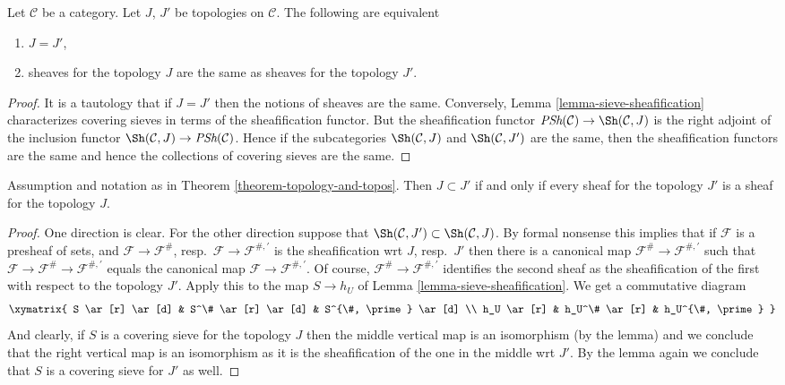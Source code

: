\begin{theorem}
\label{theorem-topology-and-topos}
Let $\mathcal{C}$ be a category.
Let $J$, $J'$ be topologies on $\mathcal{C}$.
The following are equivalent
\begin{enumerate}
\item $J = J'$,
\item sheaves for the topology $J$ are the same as
sheaves for the topology $J'$.
\end{enumerate}
\end{theorem}

\begin{proof}
It is a tautology that if $J = J'$ then the notions of sheaves
are the same. Conversely, Lemma \ref{lemma-sieve-sheafification}
characterizes covering sieves in terms of the sheafification
functor. But the sheafification functor
$\textit{PSh}(\mathcal{C}) \to \Sh(\mathcal{C}, J)$
is the right adjoint of the inclusion functor
$\Sh(\mathcal{C}, J) \to \textit{PSh}(\mathcal{C})$.
Hence if the subcategories
$\Sh(\mathcal{C}, J)$ and
$\Sh(\mathcal{C}, J')$ are the same, then the sheafification
functors are the same and hence the collections of covering
sieves are the same.
\end{proof}

\begin{lemma}
\label{lemma-finer-topology}
Assumption and notation as in Theorem \ref{theorem-topology-and-topos}.
Then $J \subset J'$ if and only if every sheaf for the
topology $J'$ is a sheaf for the topology $J$.
\end{lemma}

\begin{proof}
One direction is clear. For the other direction suppose that
$\Sh(\mathcal{C}, J') \subset \Sh(\mathcal{C}, J)$.
By formal nonsense this implies
that if $\mathcal{F}$ is a presheaf of sets,
and $\mathcal{F} \to \mathcal{F}^\#$,
resp.\ $\mathcal{F} \to \mathcal{F}^{\#, \prime}$
is the sheafification wrt $J$, resp.\ $J'$ then there
is a canonical map $\mathcal{F}^\# \to \mathcal{F}^{\#, \prime}$
such that
$\mathcal{F} \to \mathcal{F}^\# \to \mathcal{F}^{\#, \prime}$
equals the canonical map $\mathcal{F} \to \mathcal{F}^{\#, \prime}$.
Of course, $\mathcal{F}^\# \to \mathcal{F}^{\#, \prime}$
identifies the second sheaf as the sheafification of the first
with respect to the topology $J'$.
Apply this to the map $S \to h_U$ of
Lemma \ref{lemma-sieve-sheafification}. We get a commutative
diagram
$$
\xymatrix{
S \ar[r] \ar[d] &
S^\# \ar[r] \ar[d] &
S^{\#, \prime} \ar[d] \\
h_U \ar[r] &
h_U^\# \ar[r] &
h_U^{\#, \prime}
}
$$
And clearly, if $S$ is a covering sieve for the topology $J$
then the middle vertical map is an isomorphism (by the lemma)
and we conclude that the right vertical map is an isomorphism as
it is the sheafification of the one in the middle wrt $J'$.
By the lemma again we conclude that $S$ is a covering sieve
for $J'$ as well.
\end{proof}




